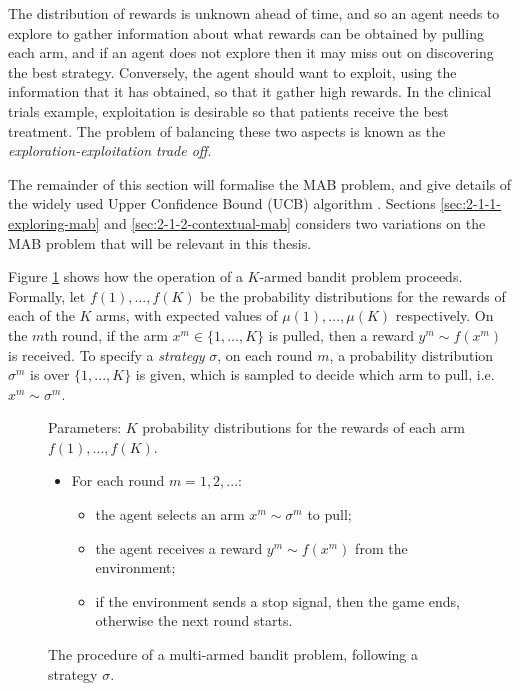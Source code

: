     The distribution of rewards is unknown ahead of time, and so an agent needs to explore to gather information about what rewards can be obtained by pulling each arm, and if an agent does not explore then it may miss out on discovering the best strategy. Conversely, the agent should want to exploit, using the information that it has obtained, so that it gather high rewards. In the clinical trials example, exploitation is desirable so that patients receive the best treatment. The problem of balancing these two aspects is known as the \textit{exploration-exploitation trade off}.
    
    The remainder of this section will formalise the MAB problem, and give details of the widely used Upper Confidence Bound (UCB) algorithm \cite{ucb}. Sections \ref{sec:2-1-1-exploring-mab} and \ref{sec:2-1-2-contextual-mab} considers two variations on the MAB problem that will be relevant in this thesis.

    Figure \ref{fig:2:mab_problem} shows how the operation of a $K$-armed bandit problem proceeds. Formally, let $f(1),...,f(K)$ be the probability distributions for the rewards of each of the $K$ arms, with expected values of $\mu(1),...,\mu(K)$ respectively. On the $m$th round, if the arm $x^m\in\{1,...,K\}$ is pulled, then a reward $y^m\sim f(x^m)$ is received. To specify a \textit{strategy} $\sigma$, on each round $m$, a probability distribution $\sigma^m$ is over $\{1,...,K\}$ is given, which is sampled to decide which arm to pull, i.e. $x^m\sim\sigma^m$.

    \begin{figure}
        \begin{tcolorbox}
            Parameters: $K$ probability distributions for the rewards of each arm $f(1),...,f(K)$.
            \begin{itemize}
                \item For each round $m=1,2,...$:
                \begin{itemize}
                    \item the agent selects an arm $x^m\sim\sigma^m$ to pull;
                    \item the agent receives a reward $y^m \sim f(x^m)$ from the environment;
                    \item if the environment sends a stop signal, then the game ends, otherwise the next round starts.
                \end{itemize} 
            \end{itemize}
        \end{tcolorbox}
        \caption{The procedure of a multi-armed bandit problem, following a strategy $\sigma$.}
        \label{fig:2:mab_problem}
    \end{figure}
    
